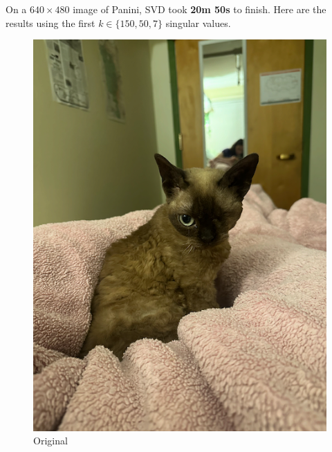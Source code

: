 \documentclass[12pt, letterpaper]{article}
\theoremstyle{definition}
\theoremstyle{remark}
\begin{document}
On a $640 \times 480$ image of Panini, SVD took \textbf{20m 50s} to finish. Here are the results 
using the first $k \in \{150, 50, 7\}$ singular values.

\begin{figure}[H]
  \centering
  \begin{minipage}[b]{0.4\textwidth}
    \includegraphics[width=\textwidth]{images/cat.png}
    \caption{Original}
  \end{minipage}
  \hfill
  \begin{minipage}[b]{0.4\textwidth}

\end{minipage}
\end{figure}
\end{document}
